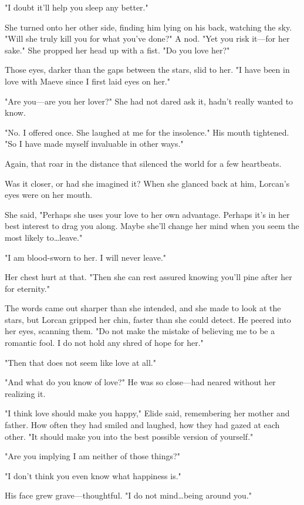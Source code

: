 "I doubt it'll help you sleep any better."

She turned onto her other side, finding him lying on his back, watching the sky.
"Will she truly kill you for what you've done?"
A nod.
"Yet you risk it---for her sake."
She propped her head up with a fist.
"Do you love her?"

Those eyes, darker than the gaps between the stars, slid to her.
"I have been in love with Maeve since I first laid eyes on her."

"Are you---are you her lover?"
She had not dared ask it, hadn't really wanted to know.

"No.
I offered once.
She laughed at me for the insolence."
His mouth tightened.
"So I have made myself invaluable in other ways."

Again, that roar in the distance that silenced the world for a few heartbeats.

Was it closer, or had she imagined it?
When she glanced back at him, Lorcan's eyes were on her mouth.

She said, "Perhaps she uses your love to her own advantage.
Perhaps it's in her best interest to drag you along.
Maybe she'll change her mind when you seem the most likely to\ldots leave."

"I am blood-sworn to her.
I will never leave."

Her chest hurt at that.
"Then she can rest assured knowing you'll pine after her for eternity."

The words came out sharper than she intended, and she made to look at the stars, but Lorcan gripped her chin, faster than she could detect.
He peered into her eyes, scanning them.
"Do not make the mistake of believing me to be a romantic fool.
I do not hold any shred of hope for her."

"Then that does not seem like love at all."

"And what do you know of love?"
He was so close---had neared without her realizing it.

"I think love should make you happy," Elide said, remembering her mother and father.
How often they had smiled and laughed, how they had gazed at each other.
"It should make you into the best possible version of yourself."

"Are you implying I am neither of those things?"

"I don't think you even know what happiness is."

His face grew grave---thoughtful.
"I do not mind\ldots being around you."

